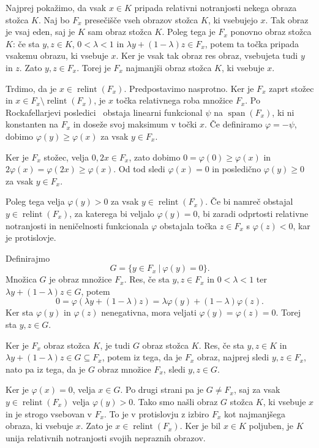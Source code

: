 \documentclass[mat2, tisk]{fmfdelo}
\begin{document}
\begin{dokaz}
Najprej pokažimo, da vsak $x\in K$ pripada relativni notranjosti
nekega obraza stožca $K$.
Naj bo $F_x$ presečišče vseh obrazov stožca $K$, ki vsebujejo $x$.
Tak obraz je vsaj eden, saj je $K$ sam obraz stožca $K$.
Poleg tega je $F_x$ ponovno obraz stožca $K$: če sta $y,z\in K$,
$0<\lambda<1$ in
$\lambda y+(1-\lambda)z\in F_x$, potem ta točka pripada vsakemu
obrazu, ki vsebuje $x$. Ker je vsak tak obraz res obraz, vsebujeta
tudi $y$ in $z$. Zato $y,z\in F_x$.
Torej je $F_x$ najmanjši obraz stožca $K$, ki vsebuje $x$.

Trdimo, da je $x\in\operatorname{relint}(F_x)$. Predpostavimo
nasprotno. Ker je $F_x$ zaprt stožec in
$x\in F_x\setminus\operatorname{relint}(F_x)$, je $x$
točka relativnega roba množice $F_x$. Po
Rockafellarjevi posledici~\cite[posledica 11.6.2, str.~100]{rockafellar}
obstaja linearni funkcional $\psi$ na $\operatorname{span}(F_x)$,
ki ni konstanten na $F_x$ in doseže svoj maksimum v točki $x$.
Če definiramo $\varphi=-\psi$, dobimo
$\varphi(y)\geq\varphi(x)$ za vsak $y\in F_x$.

Ker je $F_x$ stožec, velja $0,2x\in F_x$, zato dobimo
$0=\varphi(0)\geq\varphi(x)$ in
$2\varphi(x)=\varphi(2x)\geq\varphi(x)$.
Od tod sledi $\varphi(x)=0$ in posledično
$\varphi(y)\geq0$ za vsak $y\in F_x$.

Poleg tega velja $\varphi(y)>0$ za vsak
$y\in\operatorname{relint}(F_x)$. Če bi namreč obstajal
$y\in\operatorname{relint}(F_x)$, za katerega bi veljalo
$\varphi(y)=0$, bi zaradi odprtosti relativne notranjosti
in neničelnosti funkcionala $\varphi$ obstajala točka
$z\in F_x$ s $\varphi(z)<0$, kar je protislovje.

Definirajmo
\[
G=\{y\in F_x ~|~ \varphi(y)=0\}.
\]
Množica $G$ je obraz množice $F_x$. Res, če sta $y,z\in F_x$ in
$0<\lambda<1$ ter
$\lambda y+(1-\lambda)z\in G$, potem
\[
0=\varphi(\lambda y+(1-\lambda)z)
=\lambda\varphi(y)+(1-\lambda)\varphi(z).
\]
Ker sta $\varphi(y)$ in $\varphi(z)$ nenegativna, mora veljati
$\varphi(y)=\varphi(z)=0$. Torej sta $y,z\in G$.

Ker je $F_x$ obraz stožca $K$, je tudi $G$ obraz stožca $K$.
Res, če sta $y,z\in K$ in
$\lambda y+(1-\lambda)z\in G\subseteq F_x$, potem iz tega, da je
$F_x$ obraz, najprej sledi $y,z\in F_x$, nato pa iz tega, da je
$G$ obraz množice $F_x$, sledi $y,z\in G$.

Ker je $\varphi(x)=0$, velja $x\in G$. Po drugi strani pa je
$G\neq F_x$, saj za vsak
$y\in\operatorname{relint}(F_x)$ velja $\varphi(y)>0$.
Tako smo našli obraz $G$ stožca $K$, ki vsebuje $x$ in je strogo
vsebovan v $F_x$. To je v protislovju z izbiro $F_x$ kot
najmanjšega obraza, ki vsebuje $x$.
Zato je $x\in\operatorname{relint}(F_x)$. Ker je bil $x\in K$
poljuben, je $K$ unija relativnih notranjosti svojih nepraznih
obrazov.


\end{dokaz}
\end{document}
